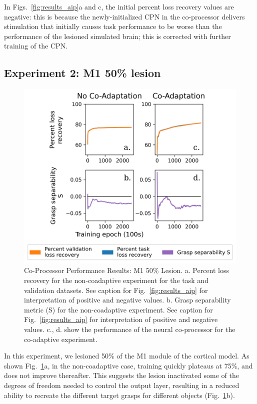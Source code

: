 \documentclass[12pt]{iopart}
\begin{document}
In Figs.\ \ref{fig:results_aip}a and c, the initial percent loss recovery values are negative: this is because the
newly-initialized CPN in the co-processor delivers stimulation that initially causes task performance to be worse
than the performance of the lesioned simulated brain; this is corrected with further training of the CPN. 

\subsection{Experiment 2: M1 50\% lesion}
\begin{figure}[h]
\centering
\includegraphics[scale=1]{training_results_m1.png}
\caption{Co-Processor Performance Results: M1 50\% Lesion. a. Percent loss recovery
         for the non-coadaptive experiment for the task and validation datasets. See caption for Fig.~\ref{fig:results_aip}
         for interpretation of positive and negative values. b. Grasp separability metric (S) for the non-coadaptive experiment.
         See caption for Fig.~\ref{fig:results_aip} for interpretation of positive and negative values. c., d. show the
         performance of the neural co-processor for the co-adaptive experiment. 
         }
\label{fig:results_m1}
\end{figure}

In this experiment, we lesioned 50\% of the M1 module of the cortical model.
As shown Fig.\ \ref{fig:results_m1}a, in the non-coadaptive case, training quickly plateaus at 75\%, and does not improve
thereafter. This suggests the lesion inactivated some of the degrees of freedom needed to
control the output layer, resulting in a reduced ability to recreate the different target grasps
for different objects (Fig.\ \ref{fig:results_m1}b). 
\end{document}
